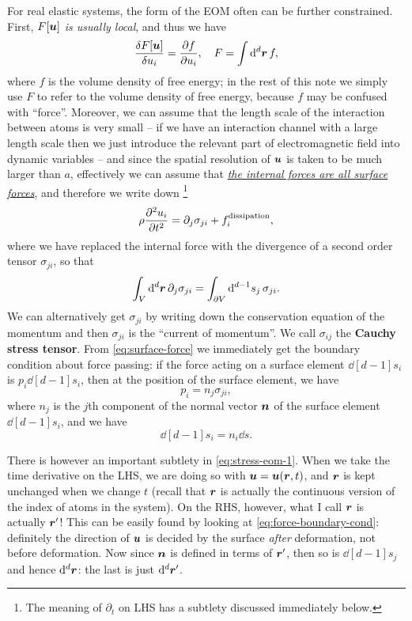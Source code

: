 \documentclass[hyperref, a4paper]{article}
\newcommand*{\concept}[1]{{\textbf{#1}}}
\begin{document}
For real elastic systems, 
the form of the EOM often can be further constrained.
First, \emph{$F[\vb*{u}]$ is usually local},
and thus we have 
\begin{equation}
    \fdv{F[\vb*{u}]}{u_i} = \pdv{f}{u_i}, \quad F = \int \dd[d]{\vb*{r}} f,
\end{equation}
where $f$ is the volume density of free energy;
in the rest of this note we simply use $F$ to refer to 
the volume density of free energy,
because $f$ may be confused with ``force''.
Moreover, we can assume that the length scale of the interaction 
between atoms 
is very small -- 
if we have an interaction channel with a large length scale 
then we just introduce the relevant part of electromagnetic field 
into dynamic variables -- 
and since the spatial resolution of $\vb*{u}$ is taken to be much larger than $a$,
effectively we can assume that 
\ul{\emph{the internal forces are all surface forces}},
and therefore we write down%
\footnote{
    The meaning of $\partial_t$ on LHS has a subtlety
    discussed immediately below.
}
\begin{equation}
    \rho \pdv[2]{u_i}{t} = \partial_{j} \sigma_{ji} + f_i^{\text{dissipation}},
    \label{eq:stress-eom-1}
\end{equation}
where we have replaced the internal force with 
the divergence of a second order tensor $\sigma_{ji}$,
so that
\begin{equation}
    \int_V \dd[d]{\vb*{r}} \partial_j \sigma_{ji}
    = \int_{\partial V} \dd[d-1]{s_j} \sigma_{ji}.
    \label{eq:surface-force}
\end{equation}
We can alternatively get $\sigma_{ji}$ by 
writing down the conservation equation of the momentum
and then $\sigma_{ji}$ is the ``current of momentum''.
We call $\sigma_{ij}$ the \concept{Cauchy stress tensor}.
From \eqref{eq:surface-force} we immediately get 
the boundary condition about force passing:
if the force acting on a surface element $\dd[d-1]{s_i}$ is 
$p_{i} \dd[d-1]{s_i}$,
then at the position of the surface element, we have 
\begin{equation}
    p_i = n_j \sigma_{ji},
    \label{eq:force-boundary-cond}
\end{equation}
where $n_j$ is the $j$th component of the normal vector $\vb*{n}$ of 
the surface element $\dd[d-1]{s_i}$,
and we have 
\begin{equation}
    \dd[d-1]{s_i} = n_i \dd{s}.
\end{equation}

There is however an important subtlety in \eqref{eq:stress-eom-1}.
When we take the time derivative on the LHS, 
we are doing so with $\vb*{u} = \vb*{u}(\vb*{r}, t)$,
and $\vb*{r}$ is kept unchanged when we change $t$
(recall that $\vb*{r}$ is actually the continuous version 
of the index of atoms in the system).
On the RHS, however, what I call $\vb*{r}$ is actually $\vb*{r}'$!
This can be easily found by looking at \eqref{eq:force-boundary-cond}:
definitely the direction of $\vb*{u}$ is decided 
by the surface \emph{after} deformation,
not before deformation.
Now since $\vb*{n}$ is defined in terms of $\vb*{r}'$,
then so is $\dd[d-1]{s_j}$ and hence $\dd[d]{\vb*{r}}$:
the last is just $\dd[d]{\vb*{r}'}$.
\end{document}
